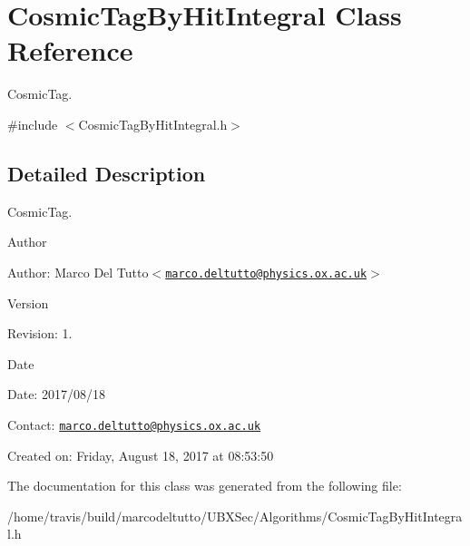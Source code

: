 \hypertarget{classCosmicTagByHitIntegral}{\section{\-Cosmic\-Tag\-By\-Hit\-Integral \-Class \-Reference}
\label{classCosmicTagByHitIntegral}
}


\-Cosmic\-Tag.  




{\ttfamily \#include $<$\-Cosmic\-Tag\-By\-Hit\-Integral.\-h$>$}



\subsection{\-Detailed \-Description}
\-Cosmic\-Tag. 

\begin{DoxyAuthor}{\-Author}

\end{DoxyAuthor}
\begin{DoxyParagraph}{\-Author\-:}
\-Marco \-Del \-Tutto$<$\href{mailto:marco.deltutto@physics.ox.ac.uk}{\tt marco.\-deltutto@physics.\-ox.\-ac.\-uk}$>$ 
\end{DoxyParagraph}


\begin{DoxyVersion}{\-Version}

\end{DoxyVersion}
\begin{DoxyParagraph}{\-Revision\-:}
1. 
\end{DoxyParagraph}


\begin{DoxyDate}{\-Date}

\end{DoxyDate}
\begin{DoxyParagraph}{\-Date\-:}
2017/08/18 
\end{DoxyParagraph}


\-Contact\-: \href{mailto:marco.deltutto@physics.ox.ac.uk}{\tt marco.\-deltutto@physics.\-ox.\-ac.\-uk}

\-Created on\-: \-Friday, \-August 18, 2017 at 08\-:53\-:50 

\-The documentation for this class was generated from the following file\-:\begin{DoxyCompactItemize}
\item 
/home/travis/build/marcodeltutto/\-U\-B\-X\-Sec/\-Algorithms/\-Cosmic\-Tag\-By\-Hit\-Integral.\-h\end{DoxyCompactItemize}
